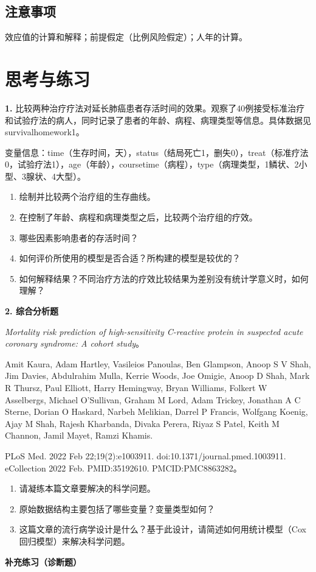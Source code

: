 \subsection{注意事项}
效应值的计算和解释；前提假定（比例风险假定）；人年的计算。
\section{思考与练习}
\textbf{1.} 比较两种治疗疗法对延长肺癌患者存活时间的效果。观察了40例接受标准治疗和试验疗法的病人，同时记录了患者的年龄、病程、病理类型等信息。具体数据见survivalhomework1。

变量信息：time（生存时间，天），status（结局死亡1，删失0），treat（标准疗法0，试验疗法1），age（年龄），coursetime（病程），type（病理类型，1鳞状、2小型、3腺状、4大型）。
\begin{enumerate}
\item 绘制并比较两个治疗组的生存曲线。
\item 在控制了年龄、病程和病理类型之后，比较两个治疗组的疗效。
\item 哪些因素影响患者的存活时间？
\item 如何评价所使用的模型是否合适？所构建的模型是较优的？
\item 如何解释结果？不同治疗方法的疗效比较结果为差别没有统计学意义时，如何理解？
\end{enumerate}
\textbf{2. 综合分析题}

\textit{Mortality risk prediction of high-sensitivity C-reactive protein in suspected acute coronary syndrome: A cohort study}。

Amit Kaura, Adam Hartley, Vasileios Panoulas, Ben Glampson, Anoop S V Shah, Jim Davies, Abdulrahim Mulla, Kerrie Woods, Joe Omigie, Anoop D Shah, Mark R Thursz, Paul Elliott, Harry Hemingway, Bryan Williams, Folkert W Asselbergs, Michael O'Sullivan, Graham M Lord, Adam Trickey, Jonathan A C Sterne, Dorian O Haskard, Narbeh Melikian, Darrel P Francis, Wolfgang Koenig, Ajay M Shah, Rajesh Kharbanda, Divaka Perera, Riyaz S Patel, Keith M Channon, Jamil Mayet, Ramzi Khamis.

PLoS Med. 2022 Feb 22;19(2):e1003911. doi:10.1371/journal.pmed.1003911. eCollection 2022 Feb. PMID:35192610. PMCID:PMC8863282。
\begin{enumerate}
\item 请凝练本篇文章要解决的科学问题。
\item 原始数据结构主要包括了哪些变量？变量类型如何？
\item 这篇文章的流行病学设计是什么？基于此设计，请简述如何用统计模型（Cox回归模型）来解决科学问题。
\end{enumerate}
\par{}\noindent\textbf{补充练习（诊断题）}
\answer{接受移植的人必须先在等待期内存活到移植那一天，这段时间被错误地归入“移植组”，形成不朽时间偏倚，使移植组显得风险更低。应把移植作为时依协变量：移植前的随访时间计入未移植状态，移植后计入移植状态，用 $(\text{start},\text{stop}]$ 计数过程数据拟合Cox模型；也可用界标分析（landmark analysis）。本章表8中的relapse存在同样的问题。}
